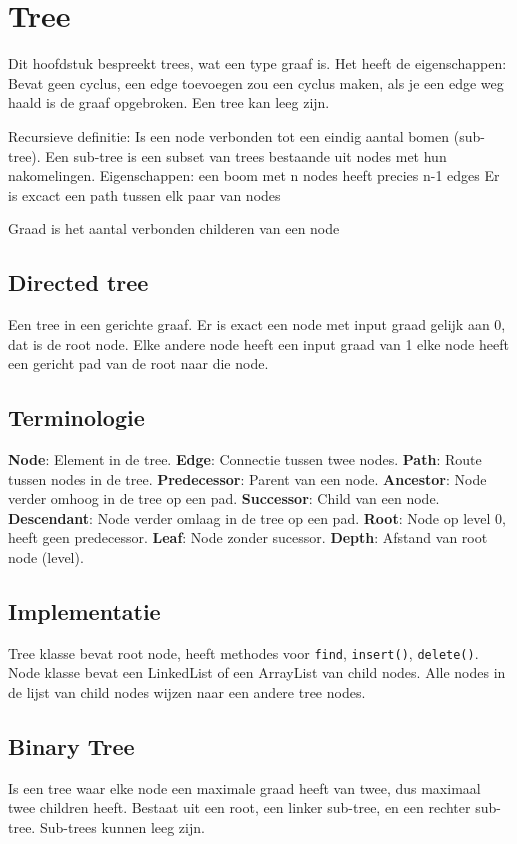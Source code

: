 \section{Tree}
Dit hoofdstuk bespreekt trees, wat een type graaf is.
Het heeft de eigenschappen:
Bevat geen cyclus, een edge toevoegen zou een cyclus maken, als je een edge weg haald is de graaf opgebroken.
Een tree kan leeg zijn.

Recursieve definitie:
Is een node verbonden tot een eindig aantal bomen (sub-tree).
Een sub-tree is een subset van trees bestaande uit nodes met hun nakomelingen.
Eigenschappen: een boom met n nodes heeft precies n-1 edges
Er is excact een path tussen elk paar van nodes

Graad is het aantal verbonden childeren van een node

\subsection{Directed tree}
Een tree in een gerichte graaf.
Er is exact een node met input graad gelijk aan 0, dat is de root node.
Elke andere node heeft een input graad van 1
elke node heeft een gericht pad van de root naar die node.

\subsection{Terminologie}
\textbf{Node}: Element in de tree.
\textbf{Edge}: Connectie tussen twee nodes.
\textbf{Path}: Route tussen nodes in de tree.
\textbf{Predecessor}: Parent van een node.
\textbf{Ancestor}: Node verder omhoog in de tree op een pad.
\textbf{Successor}: Child van een node.
\textbf{Descendant}: Node verder omlaag in de tree op een pad.
\textbf{Root}: Node op level 0, heeft geen predecessor.
\textbf{Leaf}: Node zonder sucessor.
\textbf{Depth}: Afstand van root node (level).

\subsection{Implementatie}
Tree klasse bevat root node, heeft methodes voor \texttt{find}, \texttt{insert()}, \texttt{delete()}.
Node klasse bevat een LinkedList of een ArrayList van child nodes.
Alle nodes in de lijst van child nodes wijzen naar een andere tree nodes.

\subsection{Binary Tree}
Is een tree waar elke node een maximale graad heeft van twee, dus maximaal twee children heeft.
Bestaat uit een root, een linker sub-tree, en een rechter sub-tree.
Sub-trees kunnen leeg zijn.

